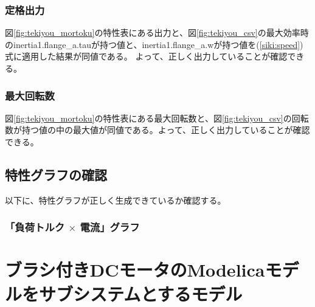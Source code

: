 \subsubsection{定格出力}
図\ref{fig:tekiyou_mortoku}の特性表にある出力と、図\ref{fig:tekiyou_csv}の最大効率時のinertia1.flange\_a.tauが持つ値と、inertia1.flange\_a.wが持つ値を(\ref{siki:speed})式に適用した結果が同値である。
よって、正しく出力していることが確認できる。
\subsubsection{最大回転数}
図\ref{fig:tekiyou_mortoku}の特性表にある最大回転数と、図\ref{fig:tekiyou_csv}の回転数が持つ値の中の最大値が同値である。よって、正しく出力していることが確認できる。
\subsection{特性グラフの確認}
以下に、特性グラフが正しく生成できているか確認する。

\subsubsection{「負荷トルク $\times$ 電流」グラフ}


\section{ブラシ付きDCモータのModelicaモデルをサブシステムとするモデル}
